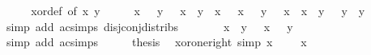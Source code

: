 \begin{isabellebody}
%
\isadelimproof
%
\endisadelimproof
%
\isatagproof
{}\isamarkupfalse%
\ {\isacharminus}{\kern0pt}\isanewline
\ \ \isamarkupfalse%
\ xor{\isacharunderscore}{\kern0pt}def\ {\isacharbrackleft}{\kern0pt}of\ x\ y{\isacharbrackright}{\kern0pt}\isanewline
\ \ \isamarkupfalse%
\ \isamarkupfalse%
\ {\isacartoucheopen}x\ \isactrlbold {\isasymsqinter}\ \isactrlbold {\isacharminus}{\kern0pt}\ y\ \isactrlbold {\isasymsqunion}\ \isactrlbold {\isacharminus}{\kern0pt}\ x\ \isactrlbold {\isasymsqinter}\ y\ {\isacharequal}{\kern0pt}\ {\isacharparenleft}{\kern0pt}{\isacharparenleft}{\kern0pt}x\ \isactrlbold {\isasymsqunion}\ \isactrlbold {\isacharminus}{\kern0pt}\ x{\isacharparenright}{\kern0pt}\ \isactrlbold {\isasymsqinter}\ {\isacharparenleft}{\kern0pt}\isactrlbold {\isacharminus}{\kern0pt}\ y\ \isactrlbold {\isasymsqunion}\ \isactrlbold {\isacharminus}{\kern0pt}\ x{\isacharparenright}{\kern0pt}{\isacharparenright}{\kern0pt}\ \isactrlbold {\isasymsqinter}\ {\isacharparenleft}{\kern0pt}x\ \isactrlbold {\isasymsqunion}\ y{\isacharparenright}{\kern0pt}\ \isactrlbold {\isasymsqinter}\ {\isacharparenleft}{\kern0pt}\isactrlbold {\isacharminus}{\kern0pt}\ y\ \isactrlbold {\isasymsqunion}\ y{\isacharparenright}{\kern0pt}{\isacartoucheclose}\isanewline
\ \ \ \ \isamarkupfalse%
\ {\isacharparenleft}{\kern0pt}simp\ add{\isacharcolon}{\kern0pt}\ ac{\isacharunderscore}{\kern0pt}simps\ disj{\isacharunderscore}{\kern0pt}conj{\isacharunderscore}{\kern0pt}distribs{\isacharparenright}{\kern0pt}\isanewline
\ \ \isamarkupfalse%
\ \isamarkupfalse%
\ {\isacartoucheopen}{\isasymdots}\ {\isacharequal}{\kern0pt}\ {\isacharparenleft}{\kern0pt}x\ \isactrlbold {\isasymsqunion}\ y{\isacharparenright}{\kern0pt}\ \isactrlbold {\isasymsqinter}\ {\isacharparenleft}{\kern0pt}\isactrlbold {\isacharminus}{\kern0pt}\ x\ \isactrlbold {\isasymsqunion}\ \isactrlbold {\isacharminus}{\kern0pt}\ y{\isacharparenright}{\kern0pt}{\isacartoucheclose}\isanewline
\ \ \ \ \isamarkupfalse%
\ {\isacharparenleft}{\kern0pt}simp\ add{\isacharcolon}{\kern0pt}\ ac{\isacharunderscore}{\kern0pt}simps{\isacharparenright}{\kern0pt}\isanewline
\ \ \isamarkupfalse%
\ \isamarkupfalse%
\ {\isacharquery}{\kern0pt}thesis\ \isacommand{{\isachardot}{\kern0pt}}\isamarkupfalse%
\isanewline
{}\isamarkupfalse%
%
\endisatagproof
{\isafoldproof}%
%
\isadelimproof
\isanewline
%
\endisadelimproof
\isanewline
{}\isamarkupfalse%
\ xor{\isacharunderscore}{\kern0pt}one{\isacharunderscore}{\kern0pt}right\ {\isacharbrackleft}{\kern0pt}simp{\isacharbrackright}{\kern0pt}{\isacharcolon}{\kern0pt}\ {\isachardoublequoteopen}x\ \isactrlbold {\isasymominus}\ \ {\isacharequal}{\kern0pt}\ \isactrlbold {\isacharminus}{\kern0pt}\ x{\isachardoublequoteclose}\isanewline

\end{isabellebody}
